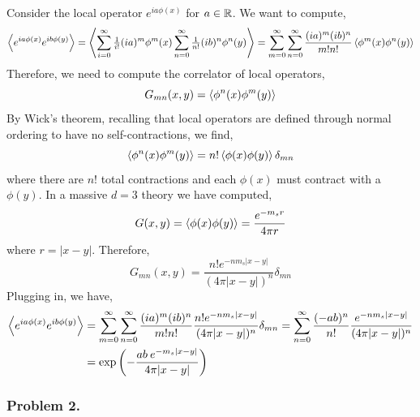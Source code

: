 \documentclass[12pt]{article}
\begin{document}
Consider the local operator $e^{i a \phi(x)}$ for $a \in \mathbb{R}$. We want to compute,
\begin{align*}
\left< e^{ia \phi(x)} e^{i b \phi(y)} \right> = \left<  \sum_{i = 0}^{\infty} \tfrac{1}{i!} (i a)^m \phi^m(x) \sum_{n = 0}^{\infty} \tfrac{1}{n!} (i b)^n \phi^n(y) \right> = \sum_{m = 0}^\infty \sum_{n = 0}^\infty \frac{(i a)^m (i b)^n}{m! n!} \left< \phi^m(x) \phi^n(y) \right> 
\end{align*}
Therefore, we need to compute the correlator of local operators,
\[ G_{mn}(x, y) = \left< \phi^n(x) \phi^m(y) \right>  \]
By Wick's theorem, recalling that local operators are defined through normal ordering to have no self-contractions, we find,
\[ \left< \phi^n(x) \phi^m(y) \right> = n! \left< \phi(x) \phi(y) \right> \delta_{mn} \]
where there are $n!$ total contractions and each $\phi(x)$ must contract with a $\phi(y)$. 
In a massive $d = 3$ theory we have computed,
\[ G(x,y) = \left< \phi(x) \phi(y) \right> = \frac{e^{- m_s r}}{4 \pi r} \]
where $r = | x - y |$. Therefore,
\[ G_{mn}(x, y) = \frac{n! e^{- n m_s |x - y|}}{(4 \pi | x - y |)^n} \delta_{mn} \]
Plugging in, we have,
\begin{align*}
\left< e^{ia \phi(x)} e^{i b \phi(y)} \right> & = \sum_{m = 0}^\infty \sum_{n = 0}^\infty \frac{(i a)^m (i b)^n}{m! n!} \frac{n! e^{- n m_s |x - y|}}{(4 \pi | x - y |)^n} \delta_{mn} = \sum_{n = 0}^{\infty} \frac{(- a b)^n}{n!} \frac{e^{- n m_s |x - y|}}{(4 \pi | x - y|)^n } 
\\
& = \exp{\left( - \frac{ab \: e^{-m_s |x - y|}}{4 \pi | x - y|} \right)}
\end{align*}

\subsubsection{Problem 2.}
\end{document}

